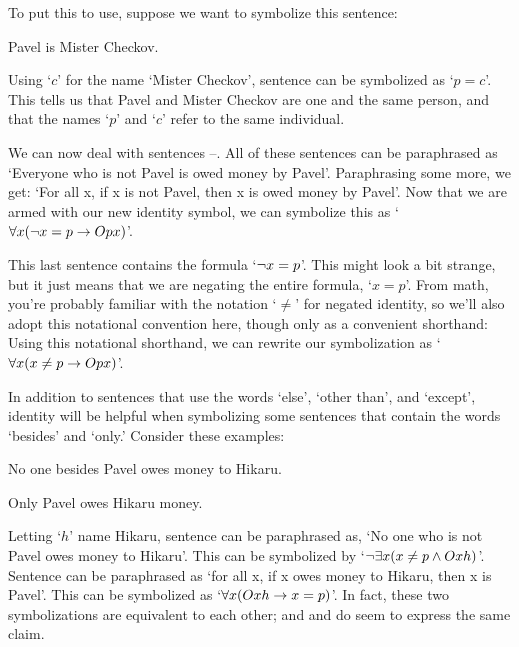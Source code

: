 To put this to use, suppose we want to symbolize this sentence:
\begin{earg}
\item[\ex{else2}] Pavel is Mister Checkov.
\end{earg}
Using `$c$' for the name `Mister Checkov', sentence  can be symbolized as `$p=c$'. This tells us that Pavel and Mister Checkov are one and the same person, and that the names `$p$' and `$c$' refer to the same individual.

We can now deal with sentences --. All of these sentences can be  paraphrased as `Everyone who is not Pavel is owed money by Pavel'. Paraphrasing some more, we get: `For all x, if x is not Pavel, then x is owed money by Pavel'. Now that we are armed with our new identity symbol, we can symbolize this as `$\forall x (\neg x = p \rightarrow Opx)$'.

This last sentence contains the formula `$\neg x = p$'. This might look a bit strange, but it just means that we are negating the entire formula, `$x = p$'.  From math, you're probably familiar with the notation `$\neq$' for negated identity, so we'll also adopt this notational convention here, though only as a convenient shorthand:
Using this notational shorthand, we can rewrite our symbolization as `$\forall x (x \neq p \rightarrow Opx)$'.


In addition to sentences that use the words `else', `other than', and `except', identity will be helpful when symbolizing some sentences that contain the words `besides' and `only.' Consider these examples:

\begin{earg}
\item[\ex{else3}] No one besides Pavel owes money to Hikaru.
\item[\ex{else4}] Only Pavel owes Hikaru money.
\end{earg}
Letting `$h$' name Hikaru, sentence  can be paraphrased as, `No one who is not Pavel owes money to Hikaru'. This can be symbolized by `$\neg\exists x(x \neq p \wedge Oxh)$'. Sentence  can be paraphrased as `for all x, if x owes money to Hikaru, then x is Pavel'. This can be symbolized as `$\forall x (Oxh \rightarrow x = p)$'.  In fact, these two symbolizations are equivalent to each other; and  and  do seem to express the same claim.

